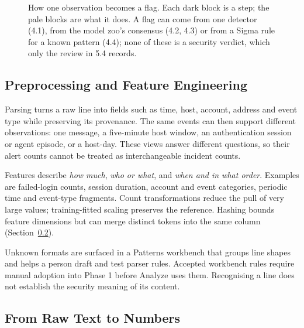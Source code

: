 \documentclass[11pt,a4paper]{article}
\begin{document}
\begin{figure}[H]
\caption{How one observation becomes a flag. Each dark block is a step; the pale blocks are what it does. A flag can come from one detector (4.1), from the model zoo's consensus (4.2, 4.3) or from a Sigma rule for a known pattern (4.4); none of these is a security verdict, which only the review in 5.4 records.}
\label{fig:core-blocks}
\end{figure}

\subsection{Preprocessing and Feature Engineering}

Parsing turns a raw line into fields such as time, host, account, address and event type while preserving its provenance. The same events can then support different observations: one message, a five-minute host window, an authentication session or agent episode, or a host-day. These views answer different questions, so their alert counts cannot be treated as interchangeable incident counts.

Features describe \emph{how much}, \emph{who or what}, and \emph{when and in what order}. Examples are failed-login counts, session duration, account and event categories, periodic time and event-type fragments. Count transformations reduce the pull of very large values; training-fitted scaling preserves the reference. Hashing bounds feature dimensions but can merge distinct tokens into the same column (Section~\ref{sec:core-vectors}).

Unknown formats are surfaced in a Patterns workbench that groups line shapes and helps a person draft and test parser rules. Accepted workbench rules require manual adoption into Phase 1 before Analyze uses them. Recognising a line does not establish the security meaning of its content.

\subsection{From Raw Text to Numbers}\label{sec:core-vectors}
\end{document}
